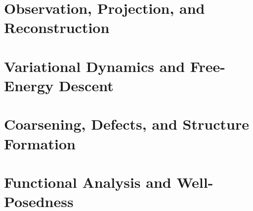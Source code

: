 \documentclass[12pt,openany]{book}
\begin{document}
\frontmatter


\tableofcontents

\mainmatter

\part{Observation, Projection, and Reconstruction}









\part{Variational Dynamics and Free-Energy Descent}






\part{Coarsening, Defects, and Structure Formation}









\part{Functional Analysis and Well-Posedness}






\end{document}
